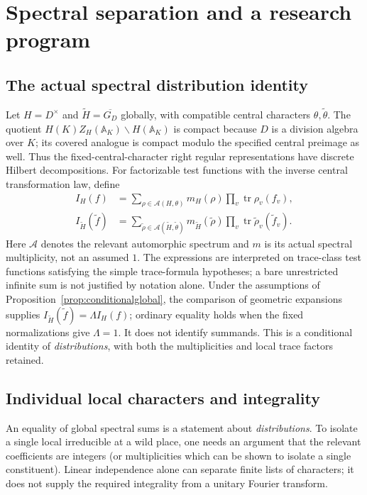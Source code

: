 \documentclass[11pt]{article}
\newcommand{\A}{\mathbb A}
\newcommand{\GDb}{\overline{G_D}}
\theoremstyle{plain}
\theoremstyle{definition}
\begin{document}
\section{Spectral separation and a research program}\label{sec:spectral}
\subsection{The actual spectral distribution identity}
Let $H=D^\times$ and $\widetilde H=\GDb$ globally, with
compatible central characters $\theta,\widetilde\theta$.
The quotient $H(K)Z_H(\A_K)\backslash H(\A_K)$ is compact
because $D$ is a division algebra over $K$; its covered analogue
is compact modulo the specified central preimage as well.
Thus the fixed-central-character right regular representations
have discrete Hilbert decompositions.  For factorizable test
functions with the inverse central transformation law, define
\begin{align}
 I_H(f)&=\sum_{\rho\in\mathcal A(H,\theta)}
       m_H(\rho)\prod_v\operatorname{tr}\rho_v(f_v),\\
 I_{\widetilde H}(\widetilde f)
     &=\sum_{\widetilde\rho\in\mathcal A(\widetilde H,\widetilde\theta)}
       m_{\widetilde H}(\widetilde\rho)
       \prod_v\operatorname{tr}\widetilde\rho_v(\widetilde f_v).
       \label{eq:spectralglobal}
\end{align}
Here $\mathcal A$ denotes the relevant automorphic spectrum
and $m$ is its actual spectral multiplicity, not an assumed $1$.
The expressions are interpreted on trace-class test functions
satisfying the simple trace-formula hypotheses; a bare
unrestricted infinite sum is not justified by notation alone.
Under the assumptions of Proposition~\ref{prop:conditionalglobal},
the comparison of geometric expansions supplies
$I_{\widetilde H}(\widetilde f)=\Lambda I_H(f)$;
ordinary equality holds when the fixed normalizations give
$\Lambda=1$.  It does not
identify summands.  This is a conditional identity of
\emph{distributions}, with both the multiplicities and local
trace factors retained.

\subsection{Individual local characters and integrality}
An equality of global spectral sums is a statement about
\emph{distributions}.  To isolate a single local irreducible at a
wild place, one needs an argument that the relevant coefficients
are integers (or multiplicities which can be shown to isolate a
single constituent).  Linear independence alone can separate
finite lists of characters; it does not supply the required
integrality from a unitary Fourier transform.
\end{document}
